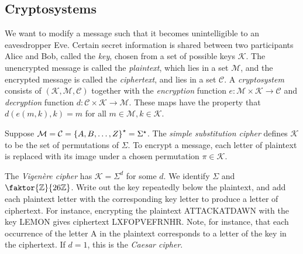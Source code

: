 \subsection{Cryptosystems}
We want to modify a message such that it becomes unintelligible to an eavesdropper Eve.
Certain secret information is shared between two participants Alice and Bob, called the \emph{key}, chosen from a set of possible keys \( \mathcal K \).
The unencrypted message is called the \emph{plaintext}, which lies in a set \( \mathcal M \), and the encrypted message is called the \emph{ciphertext}, and lies in a set \( \mathcal C \).
A \emph{cryptosystem} consists of \( (\mathcal K, \mathcal M, \mathcal C) \) together with the \emph{encryption} function \( e \colon \mathcal M \times \mathcal K \to \mathcal C \) and \emph{decryption} function \( d \colon \mathcal C \times \mathcal K \to \mathcal M \).
These maps have the property that \( d(e(m, k), k) = m \) for all \( m \in \mathcal M, k \in \mathcal K \).
\begin{example}
    Suppose \( \mathcal M = \mathcal C = \qty{A, B, \dots, Z}^\star = \Sigma^\star \).
    The \emph{simple substitution cipher} defines \( \mathcal K \) to be the set of permutations of \( \Sigma \).
    To encrypt a message, each letter of plaintext is replaced with its image under a chosen permutation \( \pi \in \mathcal K \).

    The \emph{Vigen\`ere cipher} has \( \mathcal K = \Sigma^d \) for some \( d \).
    We identify \( \Sigma \) and \( \faktor{\mathbb Z}{26\mathbb Z} \).
    Write out the key repeatedly below the plaintext, and add each plaintext letter with the corresponding key letter to produce a letter of ciphertext.
    For instance, encrypting the plaintext ATTACKATDAWN with the key LEMON gives ciphertext LXFOPVEFRNHR.
    Note, for instance, that each occurrence of the letter A in the plaintext corresponds to a letter of the key in the ciphertext.
    If \( d = 1 \), this is the \emph{Caesar cipher}.
\end{example}

